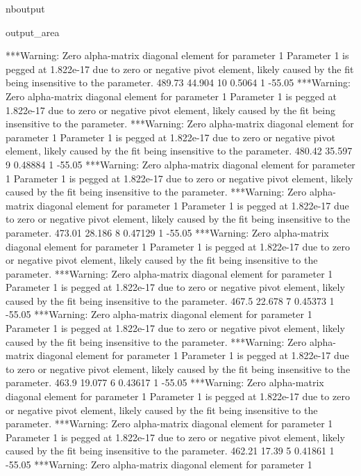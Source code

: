 \documentclass[letterpaper,10pt,english]{sphinxmanual}
\begin{document}
\begin{sphinxuseclass}{nboutput}
{\begin{sphinxuseclass}{output_area}
\begin{sphinxuseclass}{}
\begin{sphinxVerbatim}[commandchars=\\\{\}]
***Warning: Zero alpha-matrix diagonal element for parameter 1
 Parameter 1 is pegged at 1.822e-17 due to zero or negative pivot element, likely
 caused by the fit being insensitive to the parameter.
          489.73      44.904   10      0.5064    1      -55.05
***Warning: Zero alpha-matrix diagonal element for parameter 1
 Parameter 1 is pegged at 1.822e-17 due to zero or negative pivot element, likely
 caused by the fit being insensitive to the parameter.
***Warning: Zero alpha-matrix diagonal element for parameter 1
 Parameter 1 is pegged at 1.822e-17 due to zero or negative pivot element, likely
 caused by the fit being insensitive to the parameter.
          480.42      35.597    9     0.48884    1      -55.05
***Warning: Zero alpha-matrix diagonal element for parameter 1
 Parameter 1 is pegged at 1.822e-17 due to zero or negative pivot element, likely
 caused by the fit being insensitive to the parameter.
***Warning: Zero alpha-matrix diagonal element for parameter 1
 Parameter 1 is pegged at 1.822e-17 due to zero or negative pivot element, likely
 caused by the fit being insensitive to the parameter.
          473.01      28.186    8     0.47129    1      -55.05
***Warning: Zero alpha-matrix diagonal element for parameter 1
 Parameter 1 is pegged at 1.822e-17 due to zero or negative pivot element, likely
 caused by the fit being insensitive to the parameter.
***Warning: Zero alpha-matrix diagonal element for parameter 1
 Parameter 1 is pegged at 1.822e-17 due to zero or negative pivot element, likely
 caused by the fit being insensitive to the parameter.
           467.5      22.678    7     0.45373    1      -55.05
***Warning: Zero alpha-matrix diagonal element for parameter 1
 Parameter 1 is pegged at 1.822e-17 due to zero or negative pivot element, likely
 caused by the fit being insensitive to the parameter.
***Warning: Zero alpha-matrix diagonal element for parameter 1
 Parameter 1 is pegged at 1.822e-17 due to zero or negative pivot element, likely
 caused by the fit being insensitive to the parameter.
           463.9      19.077    6     0.43617    1      -55.05
***Warning: Zero alpha-matrix diagonal element for parameter 1
 Parameter 1 is pegged at 1.822e-17 due to zero or negative pivot element, likely
 caused by the fit being insensitive to the parameter.
***Warning: Zero alpha-matrix diagonal element for parameter 1
 Parameter 1 is pegged at 1.822e-17 due to zero or negative pivot element, likely
 caused by the fit being insensitive to the parameter.
          462.21       17.39    5     0.41861    1      -55.05
***Warning: Zero alpha-matrix diagonal element for parameter 1

\end{sphinxVerbatim}
\end{sphinxuseclass}
\end{sphinxuseclass}}
\end{sphinxuseclass}
\end{document}
